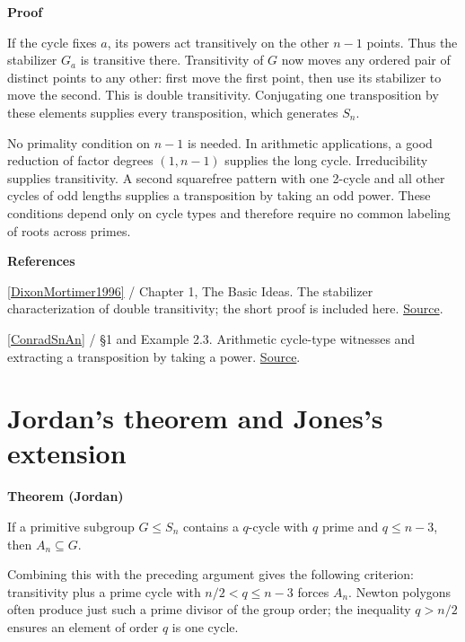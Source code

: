 \documentclass[11pt,a4paper,oneside,openany]{book}
\newenvironment{sources}{\par\smallskip\begingroup\footnotesize\color{atlasgray}\leftskip=10pt\setlength{\parskip}{2pt}}{\par\endgroup\smallskip}
\begin{document}
\begin{atlasblock}[standard]
\textbf{\sffamily Proof}\par\smallskip
\color{black} If the cycle fixes \(a\), its powers act transitively on the other \(n-1\) points. Thus the stabilizer \(G_a\) is transitive there. Transitivity of \(G\) now moves any ordered pair of distinct points to any other: first move the first point, then use its stabilizer to move the second. This is double transitivity. Conjugating one transposition by these elements supplies every transposition, which generates \(S_n\).\par
\end{atlasblock}\color{black}
\color{black} No primality condition on \(n-1\) is needed. In arithmetic applications, a good reduction of factor degrees \((1,n-1)\) supplies the long cycle. Irreducibility supplies transitivity. A second squarefree pattern with one 2-cycle and all other cycles of odd lengths supplies a transposition by taking an odd power. These conditions depend only on cycle types and therefore require no common labeling of roots across primes.\par
\begin{sources}
\textbf{References}\par\smallskip
\noindent\hyperlink{ref:DixonMortimer1996}{[DixonMortimer1996]} / Chapter 1, The Basic Ideas. The stabilizer characterization of double transitivity; the short proof is included here. \href{https://link.springer.com/book/10.1007/978-1-4612-0731-3}{Source}.\par
\noindent\hyperlink{ref:ConradSnAn}{[ConradSnAn]} / §1 and Example 2.3. Arithmetic cycle-type witnesses and extracting a transposition by taking a power. \href{https://kconrad.math.uconn.edu/blurbs/galoistheory/galoisSnAn.pdf}{Source}.\par
\end{sources}\color{black}
\section{Jordan's theorem and Jones's extension}

\begin{atlasblock}[standard]
\textbf{\sffamily Theorem (Jordan)}\par\smallskip
\color{black} If a primitive subgroup \(G\le S_n\) contains a \(q\)-cycle with \(q\) prime and \(q\le n-3\), then \(A_n\subseteq G\).\par
\end{atlasblock}\color{black}
\color{black} Combining this with the preceding argument gives the following criterion: transitivity plus a prime cycle with \(n/2<q\le n-3\) forces \(A_n\). Newton polygons often produce just such a prime divisor of the group order; the inequality \(q>n/2\) ensures an element of order \(q\) is one cycle.\par
\end{document}
